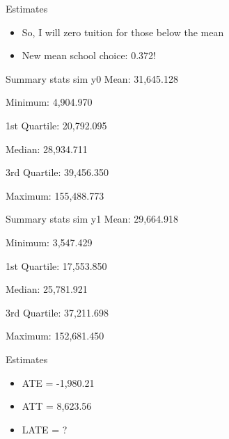 \documentclass{beamer}
\begin{document}
\begin{frame}{Estimates}
\begin{itemize}
\item So, I will zero tuition for those below the mean
\item New mean school choice: 0.372!
\end{itemize}
\end{frame}

\begin{frame}{Summary stats sim y0}
\centering
Mean:           31,645.128

Minimum:        4,904.970

1st Quartile:   20,792.095

Median:         28,934.711

3rd Quartile:   39,456.350

Maximum:        155,488.773
\end{frame}

\begin{frame}{Summary stats sim y1}
\centering
Mean:           29,664.918

Minimum:        3,547.429

1st Quartile:   17,553.850

Median:         25,781.921

3rd Quartile:   37,211.698

Maximum:        152,681.450
\end{frame}

\begin{frame}{Estimates}
\begin{itemize}
\item ATE = -1,980.21
\item ATT = 8,623.56
\item LATE = ?
\end{itemize}
\end{frame}
\end{document}
